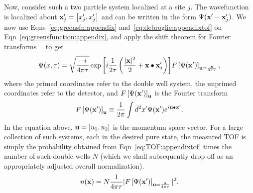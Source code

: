 Now, consider such a two particle system localized at a site $j$. The wavefunction is localized about ${\bf x}'_j = \left[ x'_j, x'_j \right]$ and can be written in the form $\Psi({\bf x}'-{\bf x}'_j)$. We now use Eqns~\ref{eq:greensfn:appendix} and~\ref{eq:debroglie:appendixtof} on Eqn~\ref{eq:greensfunction:appendix}, and apply the shift theorem for Fourier transforms~\cite{goodman}~\cite{Grondalski:etal} to get
\begin{equation}
\Psi(x,\tau) = \sqrt{\frac{-i}{4\pi\tau}}\exp{\left[ i\frac{1}{2\tau}\left( \frac{|{\bf x}|^2}{2} + {\bf x}\bullet {\bf x}'_j\right)\right]} F\left[ \Psi({\bf x}')\right]_{{\bf u}=\frac{{\bf x}}{4\pi\tau}},
\label{eq:TOF:appendixtof}
\end{equation}
where the primed coordinates refer to the double well system, the unprimed coordinates refer to the detector, and $ F\left[ \Psi({\bf x}')\right]_{\bf u}$ is the Fourier transform
\begin{equation}
F\left[ \Psi({\bf x}')\right]_{\bf u} \equiv \frac{1}{2 \pi} \int d^2x' \Psi({\bf x}') e^{i{\bf u}\bullet{\bf x}'}.
\label{eq:ft:appendix}
\end{equation}
In the equation above,  ${\bf u} = \left[ u_1, u_2 \right]$ is the momentum space vector. For a large collection of such systems, each in the desired pure state, the measured TOF is simply the probability obtained from Eqn~\ref{eq:TOF:appendixtof} times the number of such double wells $N$ (which we shall subsequently drop off as an appropriately adjusted overall normalization).
\begin{equation}
n({\bf x})= N \frac{1}{4\pi\tau} | F\left[ \Psi({\bf x}') \right]_{{\bf u}=\frac{{\bf x}}{4\pi\tau}} |^2.
\label{eq:TOFmeas:appendixtof}
\end{equation}

